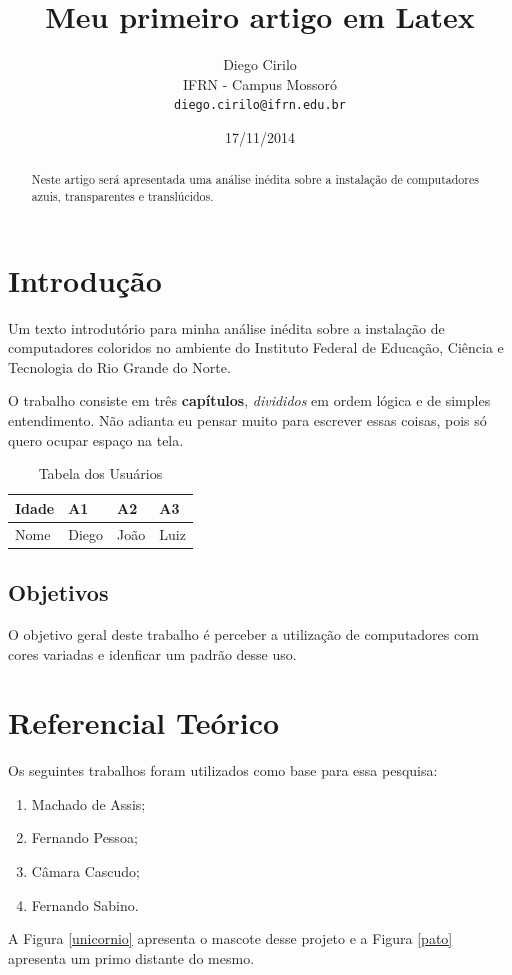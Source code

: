 \documentclass[article,brazilian,11pt]{abntex2}
\author{Diego Cirilo\\
IFRN - Campus Mossoró\\
\texttt{diego.cirilo@ifrn.edu.br}}
\title{Meu primeiro artigo em Latex}
\date{17/11/2014}
\begin{document}
\maketitle %
\begin{abstract}
Neste artigo será apresentada uma análise inédita sobre a instalação de computadores azuis, transparentes e translúcidos.
\end{abstract}

\section{Introdução}
\indent Um texto introdutório para minha análise inédita sobre a instalação de computadores coloridos no ambiente do Instituto Federal de Educação, Ciência e Tecnologia do Rio Grande do Norte.

O trabalho consiste em três \textbf{capítulos}, \textit{divididos} em ordem lógica e de simples entendimento. Não adianta eu pensar muito para escrever essas coisas, pois só quero ocupar espaço na tela.
\begin{table}[h]
\center
\caption{Tabela dos Usuários}
\begin{tabular}{|l|l|l|l|}
\hline
Idade & A1    & A2   & A3   \\ \hline
Nome  & Diego & João & Luiz \\ \hline
\end{tabular}
\end{table}
\subsection{Objetivos}
O objetivo geral deste \Huge trabalho \normalsize é perceber a utilização de computadores com cores variadas e idenficar um padrão desse uso.
\section{Referencial Teórico}
Os seguintes trabalhos foram utilizados como base para essa pesquisa:
\begin{enumerate} %
\item Machado de Assis;
\item Fernando Pessoa;
\item Câmara Cascudo;
\item Fernando Sabino.
\end{enumerate}
A Figura \ref{unicornio} apresenta o mascote desse projeto e a Figura \ref{pato} apresenta um primo distante do mesmo.
\end{document}
